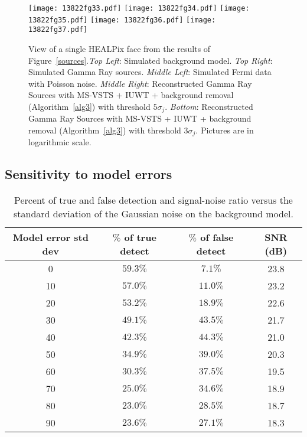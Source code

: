 \begin{figure}[htb]
\begin{center}
\texttt{[image: 13822fg33.pdf]} \hfill
\texttt{[image: 13822fg34.pdf]} \hfill
\texttt{[image: 13822fg35.pdf]} \hfill
\texttt{[image: 13822fg36.pdf]} \hfill
\texttt{[image: 13822fg37.pdf]}
\caption{View of a single HEALPix face from the results of Figure~\ref{sources}.\emph{Top Left}: Simulated background model.
\emph{Top Right}: Simulated Gamma Ray sources.
\emph{Middle Left}: Simulated Fermi data with Poisson noise.
\emph{Middle Right}: Reconstructed Gamma Ray Sources with MS-VSTS + IUWT + background removal (Algorithm~\ref{alg3}) with threshold $5\sigma_j$.
\emph{Bottom}: Reconstructed Gamma Ray Sources with MS-VSTS + IUWT + background removal (Algorithm~\ref{alg3}) with threshold $3\sigma_j$.
Pictures are in logarithmic scale.
}
\label{sourcesreest}
\end{center}
\end{figure}



\subsection{Sensitivity to model errors}
\begin{table}
  \centering
  \caption{Percent of true and false detection and signal-noise ratio versus the standard deviation of the Gaussian noise on the background model. 
  }
  \begin{tabular}{|c|c|c|c|}
\hline
Model error std dev & $\%$ of true detect & $\%$ of false detect & SNR (dB) \\
\hline
  0 & $59.3\%$ & $7.1\%$ & 23.8 \\
  10 & $57.0\%$ & $11.0\%$ & 23.2 \\
  20 & $53.2\%$ & $18.9\%$ & 22.6 \\
  30 & $49.1\%$ & $43.5\%$ & 21.7 \\
  40 & $42.3\%$ & $44.3\%$ & 21.0 \\
  50 & $34.9\%$ & $39.0\%$ & 20.3 \\
  60 & $30.3\%$ & $37.5\%$ & 19.5 \\
  70 & $25.0\%$ & $34.6\%$ & 18.9 \\
  80 & $23.0\%$ & $28.5\%$ & 18.7 \\
  90 & $23.6\%$ & $27.1\%$ & 18.3 \\  
\hline
\end{tabular}
  
  \label{table1}
\end{table}

